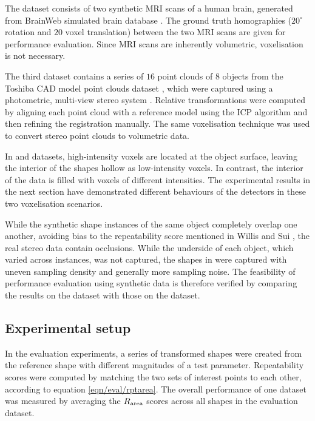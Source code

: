 The \mriset dataset consists of two synthetic MRI scans of a human brain, generated from BrainWeb simulated brain database \cite{Cocosco1997}. The ground truth homographies ($20^{\circ}$ rotation and $20$ voxel translation) between the two MRI scans are given for performance evaluation. Since MRI scans are inherently volumetric, voxelisation is not necessary. 

The third dataset \stereoset contains a series of $16$ point clouds of $8$ objects from the Toshiba CAD model point clouds dataset \cite{Pham2011}, which were captured using a photometric, multi-view stereo system \cite{Vogiatzis2011}. Relative transformations were computed by aligning each point cloud with a reference model using the ICP algorithm \cite{Besl1992} and then refining the registration manually. The same voxelisation technique was used to convert stereo point clouds to volumetric data.

In \meshset and \stereoset datasets, high-intensity voxels are located at the object surface, leaving the interior of the shapes hollow as low-intensity voxels. In contrast, the interior of the \mriset data is filled with voxels of different intensities. The experimental results in the next section have demonstrated different behaviours of the detectors in these two voxelisation scenarios.

While the synthetic shape instances of the same object completely overlap one another, avoiding bias to the repeatability score mentioned in Willis and Sui \cite{Willis2009}, the real stereo data contain occlusions. While the underside of each object, which varied across instances, was not captured, the shapes in \stereoset were captured with uneven sampling density and generally more sampling noise. The feasibility of performance evaluation using synthetic data is therefore verified by comparing the results on the \meshset dataset with those on the \stereoset dataset. 




\subsection{Experimental setup}
\label{sec/eval/variation}
In the evaluation experiments, a series of transformed shapes were created from the reference shape with different magnitudes of a test parameter. Repeatability scores were computed by matching the two sets of interest points to each other, according to equation \ref{eqn/eval/rptarea}. The overall performance of one dataset was measured by averaging the $R_\textrm{area}$ scores across all shapes in the evaluation dataset. 

